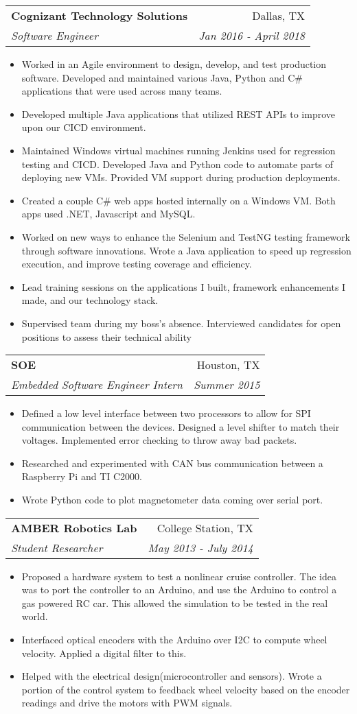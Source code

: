 \documentclass[letterpaper,11pt]{article}
\makeatletter
\newcommand{\resumeItem}[2]{
  \item\small{
    \textbf{#1}{#2 \vspace{-4pt}}
  }
}
\newcommand{\resumeSubheading}[4]{
  \vspace{-3pt}\item
    \begin{tabular*}{0.97\textwidth}[t]{l@{\extracolsep{\fill}}r}
      \textbf{#1} & #2 \\
      \textit{\small#3} & \textit{\small #4} \\
    \end{tabular*}\vspace{-8pt}
}
\newcommand{\resumeItemListStart}{\begin{itemize}[leftmargin=*]}
\newcommand{\resumeItemListEnd}{\end{itemize}\vspace{-6pt}}
\makeatother
\begin{document}
    \resumeSubheading
      {Cognizant Technology Solutions}{Dallas, TX}
      {Software Engineer}{Jan 2016 - April 2018}
      \resumeItemListStart
        \resumeItem{}
          {Worked in an Agile environment to design, develop, and test production software. Developed and maintained various Java, Python and C\# applications that were used across many teams.}
        \resumeItem{}
          {Developed multiple Java applications that utilized REST APIs to improve upon our CICD environment.}
        \resumeItem{}
          {Maintained Windows virtual machines running Jenkins used for regression testing and CICD. Developed Java and Python code to automate parts of deploying new VMs. Provided VM support during production deployments.}
        \resumeItem{}
          {Created a couple C\# web apps hosted internally on a Windows VM. Both apps used .NET, Javascript and MySQL.}
        \resumeItem{}
          {Worked on new ways to enhance the Selenium and TestNG testing framework through software innovations. Wrote a Java application to speed up regression execution, and improve testing coverage and efficiency.}
        \resumeItem{}
          {Lead training sessions on the applications I built, framework enhancements I made, and our technology stack.}
		\resumeItem{}
          {Supervised team during my boss’s absence. Interviewed candidates for open positions to assess their technical ability}
      \resumeItemListEnd

    \resumeSubheading
      {SOE}{Houston, TX}
      {Embedded Software Engineer Intern}{Summer 2015}
      \resumeItemListStart
        \resumeItem{}
          {Defined a low level interface between two processors to allow for SPI communication between the devices. Designed a level shifter to match their voltages. Implemented error checking to throw away bad packets.}
		\resumeItem{}
          {Researched and experimented with CAN bus communication between a Raspberry Pi and TI C2000.}
		\resumeItem{}
          {Wrote Python code to plot magnetometer data coming over serial port.}
      \resumeItemListEnd
      
    \resumeSubheading
      {AMBER Robotics Lab}{College Station, TX}
      {Student Researcher}{May 2013 - July 2014}
      \resumeItemListStart
        \resumeItem{}
          {Proposed a hardware system to test a nonlinear cruise controller. The idea was to port the controller to an Arduino, and use the Arduino to control a gas powered RC car. This allowed the simulation to be tested in the real world.}
        \resumeItem{}
          {Interfaced optical encoders with the Arduino over I2C to compute wheel velocity. Applied a digital filter to this.}
		\resumeItem{}
          {Helped with the electrical design(microcontroller and sensors). Wrote a portion of the control system to feedback wheel velocity based on the encoder readings and drive the motors with PWM signals.}
      \resumeItemListEnd
\end{document}
